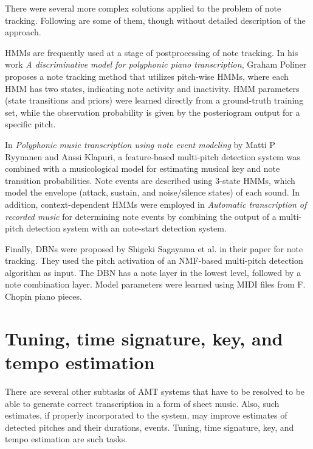 There were several more complex solutions applied to the problem of note tracking. Following are some of them, though
without detailed description of the approach.

\acp{HMM} are frequently used at a stage of postprocessing of note tracking. In his work \textit{A discriminative model
for polyphonic piano transcription}\cite{poliner2006discriminative}, Graham Poliner proposes a note tracking method that
utilizes pitch-wise \acp{HMM}, where each \ac{HMM} has two states, indicating note activity and inactivity. \ac{HMM}
parameters (state transitions and priors) were learned directly from a ground-truth training set, while the observation
probability is given by the posteriogram output for a specific pitch.

In \textit{Polyphonic music transcription using note event modeling}\cite{ryynanen2005polyphonic} by Matti P Ryynanen
and Anssi Klapuri, a feature-based multi-pitch detection system was combined with a musicological model for estimating
musical key and note transition probabilities. Note events are described using 3-state \acp{HMM}, which model
the envelope (attack, sustain, and noise/silence states) of each sound. In addition, context-dependent \acp{HMM} were
employed in \textit{Automatic transcription of recorded music}\cite{grosche2012automatic} for determining note events by
combining the output of a multi-pitch detection system with an note-start detection system.

Finally, \acp{DBN} were proposed by Shigeki Sagayama et al. in their paper\cite{raczynski2009note} for note tracking.
They used the pitch activation of an \ac{NMF}-based multi-pitch detection algorithm as input. The \ac{DBN} has a note
layer in the lowest level, followed by a note combination layer. Model parameters were learned using MIDI files from
F. Chopin piano pieces.

\section{Tuning, time signature, key, and tempo estimation}\label{sec:other-amt-subtasks}
There are several other subtasks of \ac{AMT} systems that have to be resolved to be able to generate correct
transcription in a form of sheet music. Also, such estimates, if properly incorporated to the system, may improve
estimates of detected pitches and their durations, events. Tuning, time signature, key, and tempo estimation are such
tasks.

